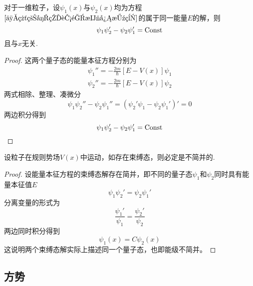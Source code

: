 \begin{theorem}\label{定理6}
    对于一维粒子，设$\psi_1(x)$与$\psi_2(x)$均为方程$\eqref{一维粒子的能量本征方程}$的属于同一能量$E$的解，则
    $$
        \psi_1\psi_2' - \psi_2\psi_1' = {\rm Const}
    $$
    且与$x$无关.
\end{theorem}
\begin{proof}
    这两个量子态的能量本征方程分别为
    $$
        \begin{aligned}
            \psi_1''=-\frac{2m}{\hbar}[E-V(x)]\psi_1 \\
            \psi_2''=-\frac{2m}{\hbar}[E-V(x)]\psi_2
        \end{aligned}
    $$
    两式相除、整理、凑微分
    $$
        \psi_1\psi_2''-\psi_2\psi_1''=(\psi_2'\psi_1-\psi_2\psi_1')'=0
    $$
    两边积分得到
    $$
        \psi_1\psi_2' - \psi_2\psi_1' = {\rm Const}
    $$
\end{proof}






\begin{theorem}\label{定理7}
    设粒子在规则势场$V(x)$中运动，如存在束缚态，则必定是不简并的.
\end{theorem}
\begin{proof}
    设能量本征方程的束缚态解存在简并，即不同的量子态$\psi_1$和$\psi_2$同时具有能量本征值$E$
    $$
        \psi_1\psi_2'=\psi_2\psi_1'
    $$
    分离变量的形式为
    $$
        \frac{\psi_1'}{\psi_1} = \frac{\psi_2'}{\psi_2}
    $$
    两边同时积分得到
    $$
        \psi_1(x)=C\psi_2(x)
    $$
    这说明两个束缚态解实际上描述同一个量子态，也即能级不简并。
\end{proof}





\subsection{方势}

